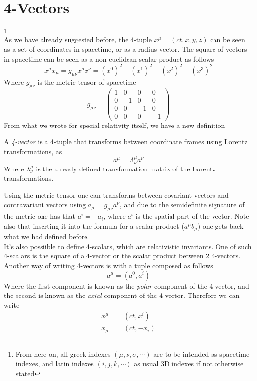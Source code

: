 \documentclass[../electromagnetism.tex]{subfiles}
\begin{document}
\section{4-Vectors}
\footnote{From here on, all greek indexes $(\mu,\nu,\sigma,\cdots)$ are to be intended as spacetime indexes, and latin indexes $(i,j,k,\cdots)$ as usual 3D indexes if not otherwise stated}\\
As we have already suggested before, the 4-tuple $x^\mu=(ct,x,y,z)$ can be seen as a set of coordinates in spacetime, or as a radius vector. The square of vectors in spacetime can be seen as a non-euclidean scalar product as follows
\begin{equation}
	x^\mu x_\mu=g_{\mu\nu}x^\mu x^\nu=(x^0)^2-(x^1)^2-(x^2)^2-(x^3)^2
	\label{eq:scalprod}
\end{equation}
Where $g_{\mu\nu}$ is the metric tensor of spacetime
\begin{equation}
	g_{\mu\nu}=\begin{pmatrix}
		1&0&0&0\\
		0&-1&0&0\\
		0&0&-1&0\\
		0&0&0&-1
	\end{pmatrix}
	\label{eq:metrictensorst}
\end{equation}
From what we wrote for special relativity itself, we have a new definition
\begin{dfn}[4-Vector]
	A \emph{4-vector} is a 4-tuple that transforms between coordinate frames using Lorentz transformations, as
	\begin{equation}
		a^\mu=\Lambda^\mu_\nu a^\nu
		\label{eq:lortran4vec}
	\end{equation}
	Where $\lambda^\mu_\nu$ is the already defined transformation matrix of the Lorentz transformations.\\
\end{dfn}
Using the metric tensor one can transforms between covariant vectors and contravariant vectors using $a_\mu=g_{\mu\nu}a^\nu$, and due to the semidefinite signature of the metric one has that $a^i=-a_i$, where $a^i$ is the spatial part of the vector. Note also that inserting it into the formula for a scalar product ($a^\mu b_\mu$) one gets back what we had defined before.\\
It's also possiible to define 4-scalars, which are relativistic invariants. One of such 4-scalars is the square of a 4-vector or the scalar product between 2 4-vectors.\\
Another way of writing 4-vectors is with a tuple composed as follows
\begin{equation}
	a^\mu=(a^0,a^i)
	\label{eq:polaraxial}
\end{equation}
Where the first component is known as the \emph{polar} component of the 4-vector, and the second is known as the \emph{axial} component of the 4-vector. Therefore we can write
\begin{equation}
	\begin{aligned}
		x^\mu&=(ct,x^i)\\
		x_\mu&=(ct,-x_i)
	\end{aligned}
	\label{eq:4coord}
\end{equation}
\end{document}

